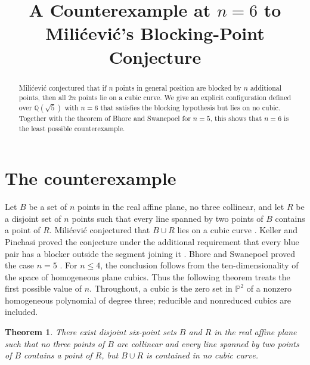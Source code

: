\documentclass[11pt]{amsart}
\title[A counterexample to Mili\'cevi\'c's conjecture]{A Counterexample at \texorpdfstring{$n=6$}{n=6} to Mili\'cevi\'c's Blocking-Point Conjecture}
\date{}
\newtheorem{theorem}{Theorem}
\begin{document}
\begin{abstract}
Mili\'cevi\'c conjectured that if $n$ points in general position are
blocked by $n$ additional points, then all $2n$ points lie on a cubic
curve. We give an explicit configuration defined over
$\mathbb{Q}(\sqrt5)$ with $n=6$ that satisfies the blocking hypothesis
but lies on no cubic. Together with the theorem of Bhore and Swanepoel
for $n=5$, this shows that $n=6$ is the least possible counterexample.
\end{abstract}

\maketitle

\section{The counterexample}

Let $B$ be a set of $n$ points in the real affine plane, no three
collinear, and let $R$ be a disjoint set of $n$ points such that every
line spanned by two points of $B$ contains a point of $R$.
Mili\'cevi\'c conjectured that $B\cup R$ lies on a cubic curve
\cite[Conjecture~5]{Milicevic}. Keller and Pinchasi proved the conjecture
under the additional requirement that every blue pair has a blocker
outside the segment joining it
\cite[Conjecture~1.2 and Theorem~1.3]{KellerPinchasi}. Bhore and
Swanepoel proved the case $n=5$ \cite[Theorem~2.9]{BhoreSwanepoel}.
For $n\leq4$, the conclusion follows from the ten-dimensionality of the
space of homogeneous plane cubics. Thus the following theorem treats
the first possible value of $n$. Throughout, a cubic is the zero set in
$\mathbb{P}^2$ of a nonzero homogeneous polynomial of degree three;
reducible and nonreduced cubics are included.

\begin{theorem}\label{thm:main}
There exist disjoint six-point sets $B$ and $R$ in the real affine
plane such that no three points of $B$ are collinear and every line
spanned by two points of $B$ contains a point of $R$, but $B\cup R$ is
contained in no cubic curve.
\end{theorem}
\end{document}
